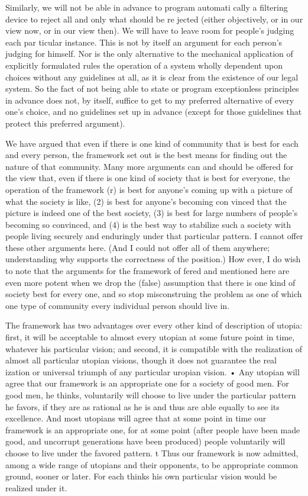 \documentclass[11pt,openany]{book}
\begin{document}
Similarly, we will not be able in advance to program automati cally a filtering device to reject all and only what should be re jected (either objectively, or in our view now, or in our view then). We will have to leave room for people's judging each par ticular instance. This is not by itself an argument for each person's judging for himself. Nor is the only alternative to the mechanical application of explicitly formulated rules the operation of a system wholly dependent upon choices without any guidelines at all, as it is clear from the existence of our legal system. So the fact of not being able to state or program exceptionless principles in advance does not, by itself, suffice to get to my preferred alternative of every one's choice, and no guidelines set up in advance (except for those guidelines that protect this preferred argument). 

We have argued that even if there is one kind of community that is best for each and every person, the framework set out is the best means for finding out the nature of that community. Many more arguments can and should be offered for the view that, even if there is one kind of society that is best for everyone, the operation of the framework (r) is best for anyone's coming up with a picture of what the society is like, (2) is best for anyone's becoming con vinced that the picture is indeed one of the best society, (3) is best for large numbers of people's becoming so convinced, and (4) is the best way to stabilize such a society with people living securely and enduringly under that particular pattern. I cannot offer these other arguments here. (And I could not offer all of them anywhere; understanding why supports the correctness of the position.) How ever, I do wish to note that the arguments for the framework of fered and mentioned here are even more potent when we drop the (false) assumption that there is one kind of society best for every one, and so stop misconstruing the problem as one of which one type of community every individual person should live in. 

The framework has two advantages over every other kind of description of utopia: first, it will be acceptable to almost every utopian at some future point in time, whatever his particular vision; and second, it is compatible with the realization of almost all particular utopian visions, though it does not guarantee the real ization or universal triumph of any particular uropian vision. • Any utopian will agree that our framework is an appropriate one for a society of good men. For good men, he thinks, voluntarily will choose to live under the particular pattern he favors, if they are as rational as he is and thus are able equally to see its excellence. And most utopians will agree that at some point in time our framework is an appropriate one, for at some point (after people have been made good, and uncorrupt generations have been produced) people voluntarily will choose to live under the favored pattern. t Thus our framework is now admitted, among a wide range of utopians and their opponents, to be appropriate common ground, sooner or later. For each thinks his own particular vision would be realized under it. 
\end{document}
